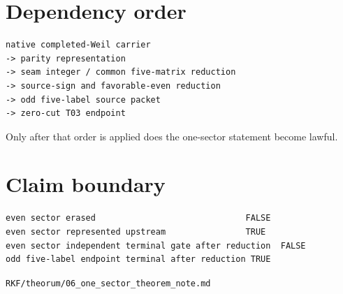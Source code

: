 \hypertarget{dependency-order}{%
\section{Dependency order}\label{dependency-order}}

\begin{verbatim}
native completed-Weil carrier
-> parity representation
-> seam integer / common five-matrix reduction
-> source-sign and favorable-even reduction
-> odd five-label source packet
-> zero-cut T03 endpoint
\end{verbatim}

Only after that order is applied does the one-sector statement become lawful.

\hypertarget{claim-boundary}{%
\section{Claim boundary}\label{claim-boundary}}

\begin{verbatim}
even sector erased                              FALSE
even sector represented upstream                TRUE
even sector independent terminal gate after reduction  FALSE
odd five-label endpoint terminal after reduction TRUE
\end{verbatim}

\begin{flushright}\small\texttt{RKF/theorum/06\_one\_sector\_theorem\_note.md}\end{flushright}
